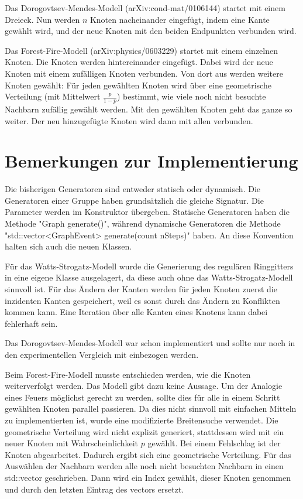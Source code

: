\documentclass[a4paper]{scrartcl}
\begin{document}
Das Dorogovtsev-Mendes-Modell (arXiv:cond-mat/0106144) startet mit einem Dreieck. Nun werden $n$ Knoten nacheinander eingefügt, indem eine Kante gewählt wird, und der neue Knoten mit den beiden Endpunkten verbunden wird.

Das Forest-Fire-Modell (arXiv:physics/0603229) startet mit einem einzelnen Knoten. Die Knoten werden hintereinander eingefügt. Dabei wird der neue Knoten mit einem zufälligen Knoten verbunden. Von dort aus werden weitere Knoten gewählt: Für jeden gewählten Knoten wird über eine geometrische Verteilung (mit Mittelwert $\frac{p}{1-p}$) bestimmt, wie viele noch nicht besuchte Nachbarn zufällig gewählt werden. Mit den gewählten Knoten geht das ganze so weiter. Der neu hinzugefügte Knoten wird dann mit allen verbunden.

\section{Bemerkungen zur Implementierung}
Die bisherigen Generatoren sind entweder statisch oder dynamisch. Die Generatoren einer Gruppe haben grundsätzlich die gleiche Signatur. Die Parameter werden im Konstruktor übergeben. Statische Generatoren haben die Methode "Graph generate()", während dynamische Generatoren die Methode "std::vector<GraphEvent> generate(count nSteps)" haben. An diese Konvention halten sich auch die neuen Klassen.

Für das Watts-Strogatz-Modell wurde die Generierung des regulären Ringgitters in eine eigene Klasse ausgelagert, da diese auch ohne das Watts-Strogatz-Modell sinnvoll ist. Für das Ändern der Kanten werden für jeden Knoten zuerst die inzidenten Kanten gespeichert, weil es sonst durch das Ändern zu Konflikten kommen kann. Eine Iteration über alle Kanten eines Knotens kann dabei fehlerhaft sein.

Das Dorogovtsev-Mendes-Modell war schon implementiert und sollte nur noch in den experimentellen Vergleich mit einbezogen werden.

Beim Forest-Fire-Modell musste entschieden werden, wie die Knoten weiterverfolgt werden. Das Modell gibt dazu keine Aussage. Um der Analogie eines Feuers möglichst gerecht zu werden, sollte dies für alle in einem Schritt gewählten Knoten parallel passieren. Da dies nicht sinnvoll mit einfachen Mitteln zu implementierten ist, wurde eine modifizierte Breitensuche verwendet. Die geometrische Verteilung wird nicht explizit generiert, stattdessen wird mit ein neuer Knoten mit Wahrscheinlichkeit $p$ gewählt. Bei einem Fehlschlag ist der Knoten abgearbeitet. Dadurch ergibt sich eine geometrische Verteilung. Für das Auswählen der Nachbarn werden alle noch nicht besuchten Nachbarn in einen std::vector geschrieben. Dann wird ein Index gewählt, dieser Knoten genommen und durch den letzten Eintrag des vectors ersetzt.
\end{document}
